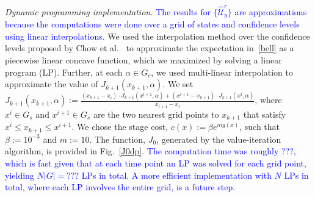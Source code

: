 \documentclass[letterpaper, 10 pt, conference]{ieeeconf}  %
\begin{document}
\textit{Dynamic programming implementation.}
\textcolor{blue}{The results for $\{\widehat{\mathcal{U}}_y^r\}$ are approximations because the computations were done 
over a grid of states and confidence levels using linear interpolations.}
We used the interpolation method over the confidence levels proposed by Chow et al.~\cite{chow2015risk} 
to approximate the expectation in~\eqref{bell} as a piecewise linear concave function, which we maximized by solving a linear program (LP).
Further, at each $\alpha \in G_c$, we used multi-linear interpolation to approximate the value of $J_{k+1}(x_{k+1}, \alpha)$.
We set $J_{k+1}(x_{k+1}, \alpha) := \frac{(x_{k+1} - x_i) \cdot J_{k+1}(x^{i+1}, \alpha) + (x^{i+1} - x_{k+1})  \cdot J_{k+1}(x^i, \alpha)}{x_{i+1}-x_i}$,
where $x^i \in G_s$ and $x^{i+1} \in G_s$ are the two nearest grid points to $x_{k+1}$ that satisfy $x^i \leq x_{k+1} \leq x^{i+1}$.
We chose the stage cost, $c(x) := \beta e^{m g(x)}$, such that $\beta := 10^{-3}$ and $m := 10$.
The function, $J_0$, generated by the value-iteration algorithm, is provided in Fig.~\ref{J0dp}.
\textcolor{blue}{The computation time was roughly ???, 
which is fast given that at each time point an LP was solved for each grid point, yielding $N|G| = ???$ LPs in total.
A more efficient implementation with $N$ LPs in total, where each LP involves the entire grid, is a future step.}
\end{document}
